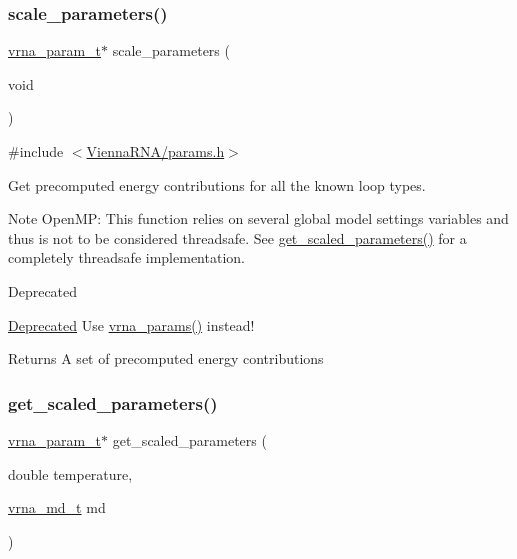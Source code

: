 \subsubsection{\texorpdfstring{scale\+\_\+parameters()}{scale\_parameters()}}
{\footnotesize\ttfamily \hyperlink{group__energy__parameters_ga8a69ca7d787e4fd6079914f5343a1f35}{vrna\+\_\+param\+\_\+t}$\ast$ scale\+\_\+parameters (\begin{DoxyParamCaption}\item[{void}]{ }\end{DoxyParamCaption})}



{\ttfamily \#include $<$\hyperlink{params_8h}{Vienna\+R\+N\+A/params.\+h}$>$}



Get precomputed energy contributions for all the known loop types. 

\begin{DoxyNote}{Note}
Open\+MP\+: This function relies on several global model settings variables and thus is not to be considered threadsafe. See \hyperlink{group__energy__parameters_ga7fa6a000d7c16feab939f2c4ee626197}{get\+\_\+scaled\+\_\+parameters()} for a completely threadsafe implementation.
\end{DoxyNote}
\begin{DoxyRefDesc}{Deprecated}
\item[\hyperlink{deprecated__deprecated000099}{Deprecated}]Use \hyperlink{group__energy__parameters_gad0e3e7e74bdc50d1709d40c92993185e}{vrna\+\_\+params()} instead!\end{DoxyRefDesc}


\begin{DoxyReturn}{Returns}
A set of precomputed energy contributions 
\end{DoxyReturn}
\mbox{\label{group__energy__parameters_ga7fa6a000d7c16feab939f2c4ee626197}} 
\subsubsection{\texorpdfstring{get\+\_\+scaled\+\_\+parameters()}{get\_scaled\_parameters()}}
{\footnotesize\ttfamily \hyperlink{group__energy__parameters_ga8a69ca7d787e4fd6079914f5343a1f35}{vrna\+\_\+param\+\_\+t}$\ast$ get\+\_\+scaled\+\_\+parameters (\begin{DoxyParamCaption}\item[{double}]{temperature,  }\item[{\hyperlink{group__model__details_ga1f8a10e12a0a1915f2a4eff0b28ea17c}{vrna\+\_\+md\+\_\+t}}]{md }\end{DoxyParamCaption})}



